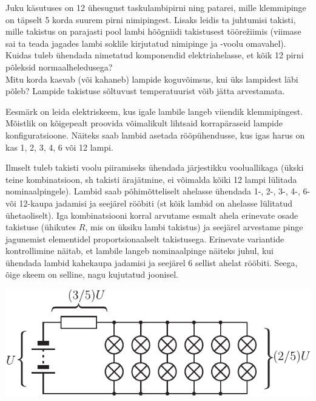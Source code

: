 
Juku käsutuses on 12 ühesugust taskulambipirni ning patarei, mille klemmipinge on täpselt 5 korda suurem pirni nimipingest. Lisaks leidis ta juhtumisi takisti, mille takistus on parajasti pool lambi hõõgniidi takistusest töörežiimis (viimase sai ta teada jagades lambi soklile kirjutatud nimipinge ja -voolu omavahel).\\
\osa Kuidas tuleb ühendada nimetatud komponendid elektriahelasse, et kõik 12 pirni põleksid normaalheledusega?\\
\osa Mitu korda kasvab (või kahaneb) lampide koguvõimsus, kui üks lampidest läbi põleb? Lampide takistuse sõltuvust temperatuurist võib jätta arvestamata.

\hint
Eesmärk on leida elektriskeem, kus igale lambile langeb viiendik klemmipingest. Mõistlik on kõigepealt proovida võimalikult lihtsaid korrapäraseid lampide konfiguratsioone. Näiteks saab lambid asetada rööpühendusse, kus igas harus on kas 1, 2, 3, 4, 6 või 12 lampi.

\solu
\osa Ilmselt tuleb takisti voolu piiramiseks ühendada järjestikku vooluallikaga (ükski teine kombinatsioon, sh takisti ärajätmine, ei võimalda kõiki 12 lampi lülitada nominaalpingele). Lambid saab põhimõtteliselt ahelasse ühendada 1-, 2-, 3-, 4-, 6- või 12-kaupa jadamisi ja seejärel rööbiti (st kõik lambid on ahelasse lülitatud ühetaoliselt). Iga kombinatsiooni korral arvutame esmalt ahela erinevate osade takistuse (ühikutes $R$, mis on üksiku lambi takistus) ja seejärel arvestame pinge jagunemist elementidel proportsionaalselt takistusega. Erinevate variantide kontrollimine näitab, et lambile langeb nominaalpinge näiteks juhul, kui ühendada lambid kahekaupa jadamisi ja seejärel 6 sellist ahelat rööbiti. Seega, õige skeem on selline, nagu kujutatud joonisel.

\begin{center}
\includegraphics{2018-v2g-08-lambid-joonis.pdf}
\end{center}


